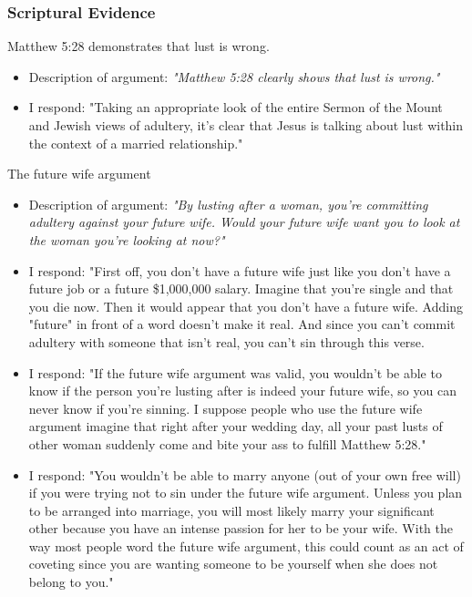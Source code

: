 \documentclass[a4paper, parskip=full, 12pt]{article}
\begin{document}
\subsubsection*{Scriptural Evidence}
  \item Matthew 5:28 demonstrates that lust is wrong.
  \begin{itemize}
    \item Description of argument: \textit{"Matthew 5:28 clearly shows that lust is wrong."}
    \item I respond: "Taking an appropriate look of the entire Sermon of the Mount and Jewish views of adultery, it's clear that Jesus is talking about lust within the context of a married relationship."
  \end{itemize}
  \item The future wife argument
  \begin{itemize}
    \item Description of argument: \textit{"By lusting after a woman, you're committing adultery against your future wife. Would your future wife want you to look at the woman you're looking at now?"}
    \item I respond: "First off, you don't have a future wife just like you don't have a future job or a future \$1,000,000 salary. Imagine that you're single and that you die now. Then it would appear that you don't have a future wife. Adding "future" in front of a word doesn't make it real. And since you can't commit adultery with someone that isn't real, you can't sin through this verse.
    \item I respond: "If the future wife argument was valid, you wouldn't be able to know if the person you're lusting after is indeed your future wife, so you can never know if you're sinning. I suppose people who use the future wife argument imagine that right after your wedding day, all your past lusts of other woman suddenly come and bite your ass to fulfill Matthew 5:28."
    \item I respond: "You wouldn't be able to marry anyone (out of your own free will) if you were trying not to sin under the future wife argument. Unless you plan to be arranged into marriage, you will most likely marry your significant other because you have an intense passion for her to be your wife. With the way most people word the future wife argument, this could count as an act of coveting since you are wanting someone to be yourself when she does not belong to you."
  \end{itemize}
\end{document}

